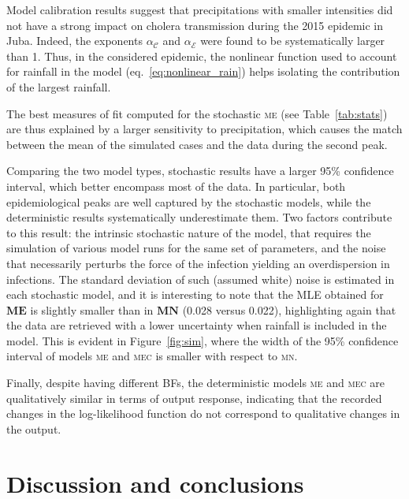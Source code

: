 Model calibration results suggest that precipitations with smaller intensities did not have a strong impact on cholera transmission during the 2015 epidemic in Juba. Indeed, the exponents $\alpha_{\mathcal{C}}$ and $\alpha_{\mathcal{E}}$ were found to be systematically larger than 1. %
  Thus, in the considered epidemic, the nonlinear function used to account for rainfall in the model (eq.~\ref{eq:nonlinear_rain}) helps isolating the contribution of the largest rainfall.

The best measures of fit computed for the stochastic \textsc{me} (see Table~\ref{tab:stats}) are thus explained by a larger sensitivity to precipitation, which causes the match between the mean of the simulated cases and the data during the second peak.

Comparing the two model types, stochastic results have a larger 95\% confidence interval, which better encompass most of the data. In particular, both epidemiological peaks are well captured by the stochastic models, while the deterministic results systematically underestimate them. Two factors contribute to this result: the intrinsic stochastic nature of the model, that requires the simulation of various model runs for the same set of parameters, and the noise that necessarily perturbs the force of the infection yielding an overdispersion in infections. The standard deviation of such (assumed white) noise is estimated in each stochastic model, and it is interesting to note that the MLE obtained for $\mathbf{ME}$ is slightly smaller than in $\mathbf{MN}$ (0.028 versus 0.022), highlighting again that the data are retrieved with a lower uncertainty when rainfall is included in the model. This is evident in Figure~\ref{fig:sim}, where the width of the 95\% confidence interval of models \textsc{me} and \textsc{mec} is smaller with respect to \textsc{mn}.

Finally, despite having different BFs, the deterministic models \textsc{me} and \textsc{mec} are qualitatively similar in terms of output response, indicating that the recorded changes in the log-likelihood function do not correspond to qualitative changes in the output.

\section{Discussion and conclusions}
\label{sec:disc}


